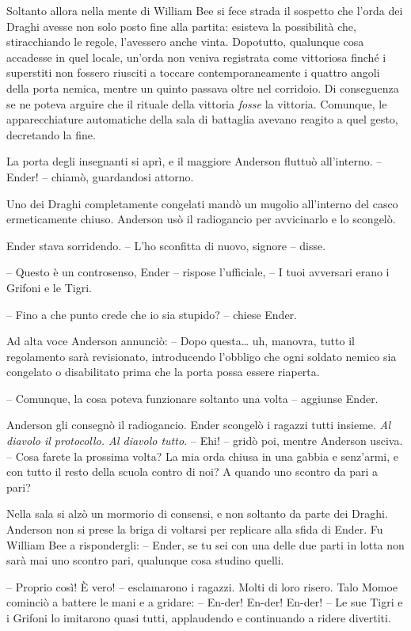 {Soltanto allora nella mente di William Bee si fece strada il sospetto
	che l'orda dei Draghi avesse non solo posto fine alla partita: esisteva
	la possibilità che, stiracchiando le regole, l'avessero anche vinta.
	Dopotutto, qualunque cosa accadesse in quel locale, un'orda non veniva
	registrata come vittoriosa finché i superstiti non fossero riusciti a
	toccare contemporaneamente i quattro angoli della porta nemica, mentre
	un quinto passava oltre nel corridoio. Di conseguenza se ne poteva
	arguire che il rituale della vittoria \emph{fosse} la vittoria.
	Comunque, le apparecchiature automatiche della sala di battaglia avevano
	reagito a quel gesto, decretando la fine.}

{La porta degli insegnanti si aprì, e il maggiore Anderson fluttuò
	all'interno. -- Ender! -- chiamò, guardandosi attorno.}

{Uno dei Draghi completamente congelati mandò un mugolio all'interno del
	casco ermeticamente chiuso. Anderson usò il radiogancio per avvicinarlo
	e lo scongelò.}

{Ender stava sorridendo. -- L'ho sconfitta di nuovo, signore -- disse.}

{-- Questo è un controsenso, Ender -- rispose l'ufficiale, -- I tuoi
	avversari erano i Grifoni e le Tigri.}

{-- Fino a che punto crede che io sia stupido? -- chiese Ender.}

{Ad alta voce Anderson annunciò: -- Dopo questa\ldots{} uh, manovra,
	tutto il regolamento sarà revisionato, introducendo l'obbligo che ogni
	soldato nemico sia congelato o disabilitato prima che la porta possa
	essere riaperta.}

{-- Comunque, la cosa poteva funzionare soltanto una volta -- aggiunse
	Ender.}

{Anderson gli consegnò il radiogancio. Ender scongelò i ragazzi tutti
	insieme. \emph{Al diavolo il protocollo. Al diavolo tutto.} -- Ehi! --
	gridò poi, mentre Anderson usciva. -- Cosa farete la prossima volta? La
	mia orda chiusa in una gabbia e senz'armi, e con tutto il resto della
	scuola contro di noi? A quando uno scontro da pari a pari?}

{Nella sala si alzò un mormorio di consensi, e non soltanto da parte dei
	Draghi. Anderson non si prese la briga di voltarsi per replicare alla
	sfida di Ender. Fu William Bee a rispondergli: -- Ender, se tu sei con
	una delle due parti in lotta non sarà mai uno scontro pari, qualunque
	cosa studino quelli.}

{-- Proprio così! È vero! -- esclamarono i ragazzi. Molti di loro
	risero. Talo Momoe cominciò a battere le mani e a gridare: -- En-der!
	En-der! En-der! -- Le sue Tigri e i Grifoni lo imitarono quasi tutti,
	applaudendo e continuando a ridere divertiti.}

